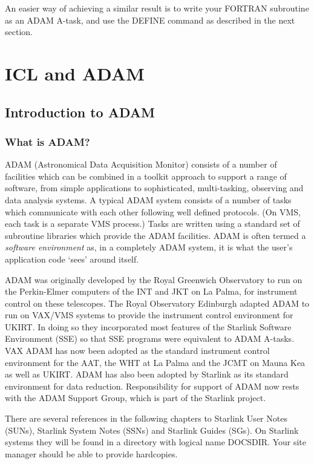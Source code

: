 \documentclass[twoside,11pt]{report}
\newcommand{\stardocinitials}  {SG}
\newcommand{\stardocnumber}    {5.2}
\newcommand{\stardocname}{\stardocinitials /\stardocnumber}
\newcommand{\xlabel}[1]{}
\begin{document}
An easier way of achieving a similar result is to write your FORTRAN
subroutine as an ADAM A-task, and use the DEFINE command as described in
the next section.
                    
\cleardoublepage
\part{ICL and ADAM}
   \markboth{\stardocname}{\stardocname}

\chapter{\xlabel{introduction_to_adam}Introduction to ADAM}

\section{\xlabel{what_is_adam}What is ADAM?}

ADAM (Astronomical Data Acquisition Monitor) consists of a number of facilities
which can be combined in a toolkit approach to support a range of software,
from simple applications to sophisticated, multi-tasking, observing and data
analysis systems.
A typical ADAM system consists of a number of tasks which communicate with each
other following well defined protocols.
(On VMS, each task is a separate VMS process.)
Tasks are written using a standard set of subroutine libraries which provide
the ADAM facilities.
ADAM is often termed a {\em software environment} as, in a completely ADAM
system, it is what the user's application code `sees' around itself.

ADAM was originally developed by the Royal Greenwich Observatory to run on the
Perkin-Elmer computers of the INT and JKT on La Palma, for instrument
control on these telescopes. The Royal Observatory
Edinburgh adapted ADAM to run on VAX/VMS systems to provide the
instrument control environment for UKIRT. In doing so they incorporated
most features of the Starlink Software Environment (SSE) so that SSE programs
were equivalent to ADAM A-tasks. VAX ADAM has now been adopted as the
standard instrument control environment for the AAT, the WHT at La Palma
and the JCMT on Mauna Kea as well as UKIRT. ADAM has also been adopted
by Starlink as its standard environment for data reduction. 
Responsibility for support of ADAM now rests with the ADAM Support Group, 
which is part of the Starlink project.

There are several references in the following chapters to Starlink User Notes
(SUNs), Starlink System Notes (SSNs) and Starlink Guides (SGs).
On Starlink systems they will be found in a directory with logical name 
DOCSDIR. Your site manager should be able to provide hardcopies.
\end{document}
